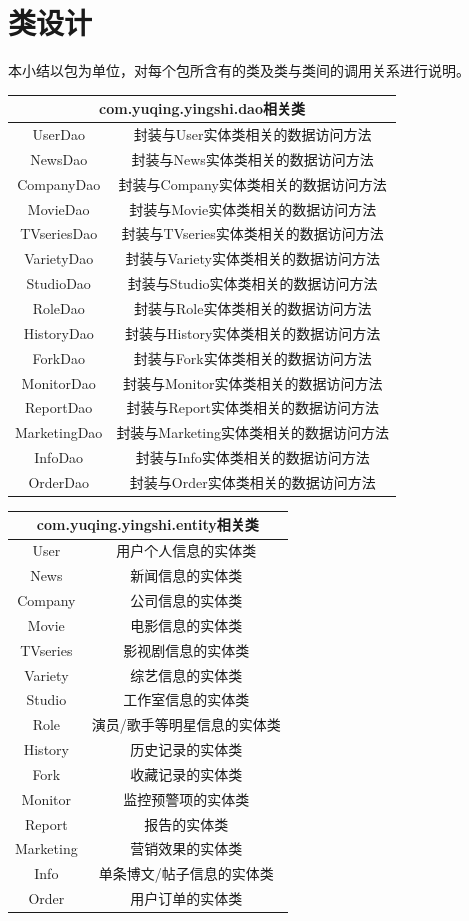 \section{类设计}
本小结以包为单位，对每个包所含有的类及类与类间的调用关系进行说明。
\begin{tabular}{|c|c|} 
\hline 
\multicolumn{2}{|c|}{com.yuqing.yingshi.dao相关类} \\ 
\hline 
UserDao&封装与User实体类相关的数据访问方法\\
NewsDao&封装与News实体类相关的数据访问方法\\
CompanyDao&封装与Company实体类相关的数据访问方法\\
MovieDao&封装与Movie实体类相关的数据访问方法\\
TVseriesDao&封装与TVseries实体类相关的数据访问方法\\
VarietyDao&封装与Variety实体类相关的数据访问方法\\
StudioDao&封装与Studio实体类相关的数据访问方法\\
RoleDao&封装与Role实体类相关的数据访问方法\\
HistoryDao&封装与History实体类相关的数据访问方法\\
ForkDao&封装与Fork实体类相关的数据访问方法\\
MonitorDao&封装与Monitor实体类相关的数据访问方法\\
ReportDao&封装与Report实体类相关的数据访问方法\\
MarketingDao&封装与Marketing实体类相关的数据访问方法\\
InfoDao&封装与Info实体类相关的数据访问方法\\
OrderDao &封装与Order实体类相关的数据访问方法\\
\hline 
\end{tabular}


\begin{tabular}{|c|c|} 
\hline 
\multicolumn{2}{|c|}{com.yuqing.yingshi.entity相关类} \\ 
\hline 
User &用户个人信息的实体类\\
News &新闻信息的实体类\\
Company &公司信息的实体类\\
Movie&电影信息的实体类\\
TVseries&影视剧信息的实体类\\
Variety&综艺信息的实体类\\
Studio&工作室信息的实体类\\
Role&演员/歌手等明星信息的实体类\\
History&历史记录的实体类\\
Fork&收藏记录的实体类\\
Monitor&监控预警项的实体类\\
Report&报告的实体类\\
Marketing&营销效果的实体类\\
Info &单条博文/帖子信息的实体类\\
Order &用户订单的实体类\\
\hline 
\end{tabular}




